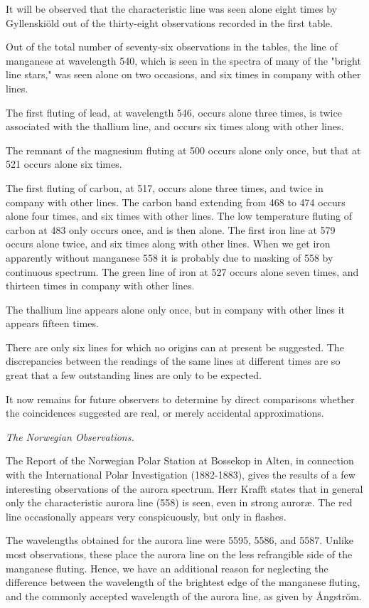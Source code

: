 \documentclass[a4paper, 12pt, oneside, polutonikogreek, english]{article}
\begin{document}
It will be observed that the characteristic line was seen alone eight times by Gyllenskiöld out of the thirty-eight observations recorded in the first table.

Out of the total number of seventy-six observations in the tables, the line of manganese at wavelength 540, which is seen in the spectra of many of the "bright line stars," was seen alone on two occasions, and six times in company with other lines.

The first fluting of lead, at wavelength 546, occurs alone three times, is twice associated with the thallium line, and occurs six times along with other lines.

The remnant of the magnesium fluting at 500 occurs alone only once, but that at 521 occurs alone six times.

The first fluting of carbon, at 517, occurs alone three times, and twice in company with other lines. The carbon band extending from 468 to 474 occurs alone four times, and six times with other lines. The low temperature fluting of carbon at 483 only occurs once, and is then alone. The first iron line at 579 occurs alone twice, and six times along with other lines. When we get iron apparently without manganese 558 it is probably due to masking of 558 by continuous spectrum. The green line of iron at 527 occurs alone seven times, and thirteen times in company with other lines.

The thallium line appears alone only once, but in company with other lines it appears fifteen times.

There are only six lines for which no origins can at present be suggested. The discrepancies between the readings of the same lines at different times are so great that a few outstanding lines are only to be expected.

It now remains for future observers to determine by direct comparisons whether the coincidences suggested are real, or merely accidental approximations.

\emph{The Norwegian Observations.}

The Report of the Norwegian Polar Station at Bossekop in Alten, in connection with the International Polar Investigation (1882-1883), gives the results of a few interesting observations of the aurora spectrum. Herr Krafft states that in general only the characteristic aurora line (558) is seen, even in strong auroræ. The red line occasionally appears very conspicuously, but only in flashes.

The wavelengths obtained for the aurora line were 5595, 5586, and 5587. Unlike most observations, these place the aurora line on the less refrangible side of the manganese fluting. Hence, we have an additional reason for neglecting the difference between the wavelength of the brightest edge of the manganese fluting, and the commonly accepted wavelength of the aurora line, as given by Ångström.
\end{document}

